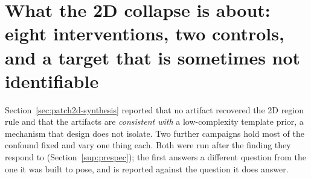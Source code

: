 \documentclass[11pt]{article}
\theoremstyle{definition}
\theoremstyle{remark}
\begin{document}
\section{What the 2D collapse is about: eight interventions, two controls, and a target that is sometimes not identifiable}
\label{sec:arity}

Section~\ref{sec:patch2d-synthesis} reported that no artifact recovered the 2D region rule and that the artifacts are \emph{consistent with} a low-complexity template prior, a mechanism that design does not isolate. Two further campaigns hold most of the confound fixed and vary one thing each. Both were run after the finding they respond to (Section~\ref{sup:prespec}); the first answers a different question from the one it was built to pose, and is reported against the question it does answer.
\end{document}
